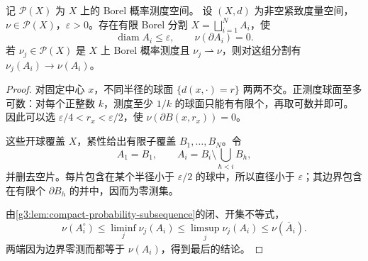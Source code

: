 \begin{lemma}\label{g3:lem:C-small-continuity-partition}
	记 \(\mathcal P(X)\) 为 \(X\) 上的 Borel 概率测度空间。
	设 \((X,d)\) 为非空紧致度量空间，\(\nu\in\mathcal P(X)\)，\(\varepsilon>0\)。存在有限 Borel 分割
	\(X=\bigsqcup_{i=1}^N A_i\)，使
	\[
		\operatorname{diam}A_i\le\varepsilon,\qquad
		\nu(\partial A_i)=0.
	\]
	若 \(\nu_j\in\mathcal P(X)\) 是 \(X\) 上 Borel 概率测度且 \(\nu_j\rightharpoonup\nu\)，则对这组分割有
	\(\nu_j(A_i)\to\nu(A_i)\)。
\end{lemma}
\begin{proof}
	对固定中心 \(x\)，不同半径的球面 \(\{d(x,\cdot)=r\}\) 两两不交。正测度球面至多可数：对每个正整数 \(k\)，测度至少 \(1/k\) 的球面只能有有限个，再取可数并即可。因此可以选
	\(\varepsilon/4<r_x<\varepsilon/2\)，使
	\(\nu(\partial B(x,r_x))=0\)。

	这些开球覆盖 \(X\)，紧性给出有限子覆盖 \(B_1,\ldots,B_N\)。令
	\[
		A_1=B_1,\qquad A_i=B_i\setminus\bigcup_{h<i}B_h,
	\]
	并删去空片。每片包含在某个半径小于 \(\varepsilon/2\) 的球中，所以直径小于 \(\varepsilon\)；其边界包含在有限个 \(\partial B_h\) 的并中，因而为零测集。

	由\cref{g3:lem:compact-probability-subsequence}的闭、开集不等式，
	\[
		\nu(A_i^\circ)
		\le\liminf_j\nu_j(A_i)
		\le\limsup_j\nu_j(A_i)
		\le\nu(\overline A_i).
	\]
	两端因为边界零测而都等于 \(\nu(A_i)\)，得到最后的结论。
\end{proof}


